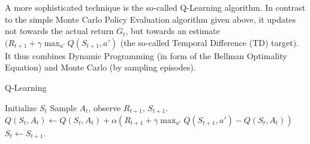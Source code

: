 A more sophisticated technique is the so-called Q-Learning algorithm. In contrast to the simple Monte Carlo Policy Evaluation algorithm given above, it updates not towards the actual return $G_t$, but towards an estimate $(R_{t+1} + \gamma \max_{a'} Q(S_{t+1},a')$ (the so-called Temporal Difference (TD) target). It thus combines Dynamic Programming (in form of the Bellman Optimality Equation) and Monte Carlo (by sampling episodes).

\begin{algorithm}[t!]
\label{algo:q-learning}
   \caption{Q-Learning}
\begin{algorithmic}[1]
\STATE Initialize $S_t$
\STATE Sample $A_t$, observe $R_{t+1}$, $S_{t+1}$.
\STATE $Q(S_t,A_t) \leftarrow Q(S_t,A_t) + \alpha (R_{t+1} + \gamma \max_{a'} Q(S_{t+1},a') - Q(S_t,A_t))$
\STATE $S_t \leftarrow S_{t+1}$.
\ENDFOR
	\ENDFOR
\end{algorithmic}
\end{algorithm}

